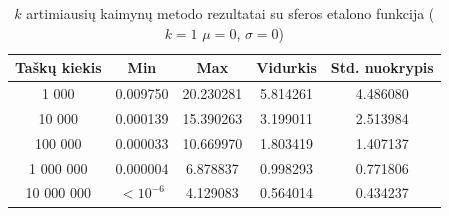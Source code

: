 \begin{table}[H]
    \centering
    \begin{tabular}{|c|c|c|c|c|}
        \hline
        \textbf{Taškų kiekis} & \textbf{Min} & \textbf{Max} & \textbf{Vidurkis} & \textbf{Std. nuokrypis} \\ \hline
        1 000        & 0.009750 & 20.230281 & 5.814261 & 4.486080 \\ \hline
        10 000       & 0.000139 & 15.390263 & 3.199011 & 2.513984 \\ \hline
        100 000      & 0.000033 & 10.669970 & 1.803419 & 1.407137 \\ \hline
        1 000 000    & 0.000004 & 6.878837 & 0.998293 & 0.771806 \\ \hline
        10 000 000   & $<10^{-6}$ & 4.129083 & 0.564014 & 0.434237 \\ \hline
    \end{tabular}
    \caption{$k$ artimiausių kaimynų metodo rezultatai su sferos etalono funkcija ($k = 1$ $\mu = 0$, $\sigma = 0$)}
\end{table}